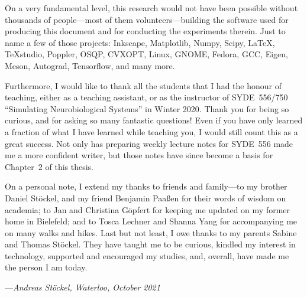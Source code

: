 On a very fundamental level, this research would not have been possible without thousands of people---most of them volunteers---building the software used for producing this document and for conducting the experiments therein. Just to name a few of those projects: Inkscape, Matplotlib, Numpy, Scipy, \LaTeX, \TeX studio, Poppler, OSQP, CVXOPT, Linux, GNOME, Fedora, GCC, Eigen, Meson, Autograd, Tensorflow, and many more.

Furthermore, I would like to thank all the students that I had the honour of teaching, either as a teaching assistant, or as the instructor of SYDE~556/750 \enquote{Simulating Neurobiological Systems} in Winter 2020.
Thank you for being so curious, and for asking so many fantastic questions!
Even if you have only learned a fraction of what I have learned while teaching you, I would still count this as a great success.
Not only has preparing weekly lecture notes for SYDE~556 made me a more confident writer, but those notes have since become a basis for Chapter~2 of this thesis.

On a personal note, I extend my thanks to friends and family---to my brother Daniel Stöckel, and my friend Benjamin Paaßen for their words of wisdom on academia; to Jan and Christina Göpfert for keeping me updated on my former home in Bielefeld; and to Tosca Lechner and Shanna Yang for accompanying me on many walks and hikes.
Last but not least, I owe thanks to my parents Sabine and Thomas Stöckel.
They have taught me to be curious, kindled my interest in technology, supported and encouraged my studies, and, overall, have made me the person I am today.

\bigskip

{
\raggedleft
---\emph{Andreas Stöckel, Waterloo, October 2021}\\
}
